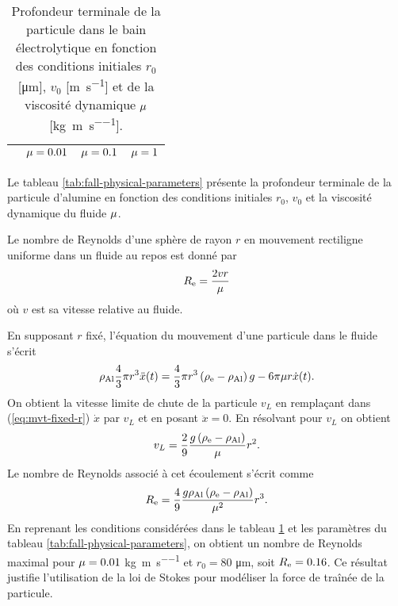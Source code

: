 \begin{table}
  \begin{center}
    \caption{Profondeur terminale de la particule dans le bain
      électrolytique en fonction des conditions initiales $r_0$
      [\si{\micro\meter}], $v_0$ [\si{\meter\per\second}] et de la
      viscosité dynamique $\mu$
      [\si{\kilo\gram\per\meter\per\second}].}
    \label{tab:fall-results}
    \begin{tabularx}{\textwidth}{@{}lXXX@{}}
      \toprule
      & $\mu = \num{0.01}$ & $\mu = \num{0.1}$ & $\mu = \num{1}$ \\
      \midrule
      
      \bottomrule
    \end{tabularx}
  \end{center}
\end{table}


Le tableau \ref{tab:fall-physical-parameters} présente la profondeur
terminale de la particule d'alumine en fonction des conditions
initiales $r_0$, $v_0$ et la viscosité dynamique du fluide
$\mu$.

\begin{remarque}
  Le nombre de Reynolds d'une sphère de rayon $r$ en mouvement
  rectiligne uniforme dans un fluide au repos est donné par
  \begin{equation}
    R_{\mathrm e} = \frac{2 v r}{\mu}
  \end{equation}
  où $v$ est sa vitesse relative au fluide.

  En supposant $r$ fixé, l'équation du mouvement d'une particule
  dans le fluide s'écrit
  \begin{equation}\label{eq:mvt-fixed-r}
    \rho_\mathrm{Al} \frac{4}{3}\pi r^3 \ddot x(t) = \frac{4}{3}\pi r^3\left( \rho_\mathrm{e} - \rho_\mathrm{Al} \right)g -
  6\pi\mu r\dot x(t).
  \end{equation}
  On obtient la vitesse limite de chute de la particule $v_L$ en
  remplaçant dans (\ref{eq:mvt-fixed-r}) $\dot x$ par $v_L$ et en posant $\ddot x
  = 0$. En résolvant pour $v_L$ on obtient
  \begin{equation}
    v_L = \frac{2}{9}\frac{g\left( \rho_\mathrm{e} - \rho_\mathrm{Al} \right)}{\mu}r^2.
  \end{equation}
  Le nombre de Reynolds associé à cet écoulement s'écrit comme
  \begin{equation}
    R_{\mathrm e} = \frac{4}{9}\frac{g\rho_\mathrm{Al}\left( \rho_\mathrm{e} - \rho_\mathrm{Al} \right)}{\mu^2}r^3.
  \end{equation}
  En reprenant les conditions considérées dans le tableau
  \ref{tab:fall-results} et les paramètres du tableau
  \ref{tab:fall-physical-parameters}, on obtient un nombre de Reynolds
  maximal pour $\mu = 0.01$
  \si{\kilo\gram\per\meter\per\second} et $r_0 = 80$
  \si{\micro\meter}, soit $R_{\mathrm e} = 0.16$. Ce résultat justifie
  l'utilisation de la loi de Stokes pour modéliser la force de traînée
  de la particule.
\end{remarque}

